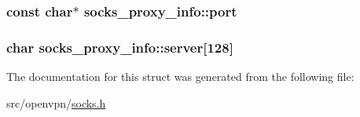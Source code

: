\subsubsection[{port}]{\setlength{\rightskip}{0pt plus 5cm}const char$\ast$ socks\+\_\+proxy\+\_\+info\+::port}\label{structsocks__proxy__info_a7b1b9cdaf83b172eb24b105c3639fd2e}
\hypertarget{structsocks__proxy__info_a546f00e9abaf7613b763cfc6675aadc9}{}
\subsubsection[{server}]{\setlength{\rightskip}{0pt plus 5cm}char socks\+\_\+proxy\+\_\+info\+::server\mbox{[}128\mbox{]}}\label{structsocks__proxy__info_a546f00e9abaf7613b763cfc6675aadc9}


The documentation for this struct was generated from the following file\+:\begin{DoxyCompactItemize}
\item 
src/openvpn/\hyperlink{socks_8h}{socks.\+h}\end{DoxyCompactItemize}
